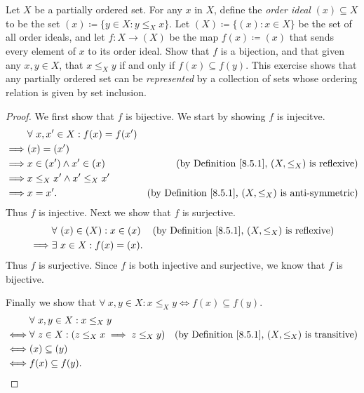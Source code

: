 \begin{exercise}\label{ex 8.5.6}
    Let \(X\) be a partially ordered set.
    For any \(x\) in \(X\), define the \emph{order ideal} \((x) \subseteq X\) to be the set \((x) \coloneqq \{y \in X : y \leq_X x\}\).
    Let \((X) \coloneqq \{(x) : x \in X\}\) be the set of all order ideals, and let \(f : X \to (X)\) be the map \(f(x) \coloneqq (x)\) that sends every element of \(x\) to its order ideal.
    Show that \(f\) is a bijection, and that given any \(x, y \in X\), that \(x \leq_X y\) if and only if \(f(x) \subseteq f(y)\).
    This exercise shows that any partially ordered set can be \emph{represented} by a collection of sets whose ordering relation is given by set inclusion.
\end{exercise}

\begin{proof}
    We first show that \(f\) is bijective.
    We start by showing \(f\) is injecitve.
    \begin{align*}
                 & \forall\ x, x' \in X : f(x) = f(x')                                                                         \\
        \implies & (x) = (x')                                                                                                  \\
        \implies & x \in (x') \land x' \in (x)         & \text{(by Definition \ref{8.5.1}, \((X, \leq_X)\) is reflexive)}      \\
        \implies & x \leq_X x' \land x' \leq_X x'                                                                              \\
        \implies & x = x'.                             & \text{(by Definition \ref{8.5.1}, \((X, \leq_X)\) is anti-symmetric)}
    \end{align*}
    Thus \(f\) is injective.
    Next we show that \(f\) is surjective.
    \begin{align*}
                 & \forall\ (x) \in (X) : x \in (x) & \text{(by Definition \ref{8.5.1}, \((X, \leq_X)\) is reflexive)} \\
        \implies & \exists\ x \in X : f(x) = (x).
    \end{align*}
    Thus \(f\) is surjective.
    Since \(f\) is both injective and surjective, we know that \(f\) is bijective.

    Finally we show that \(\forall\ x, y \in X : x \leq_X y \iff f(x) \subseteq f(y)\).
    \begin{align*}
             & \forall\ x, y \in X : x \leq_X y                                                                                        \\
        \iff & \forall\ z \in X : (z \leq_X x \implies z \leq_X y) & \text{(by Definition \ref{8.5.1}, \((X, \leq_X)\) is transitive)} \\
        \iff & (x) \subseteq (y)                                                                                                       \\
        \iff & f(x) \subseteq f(y).
    \end{align*}
\end{proof}

